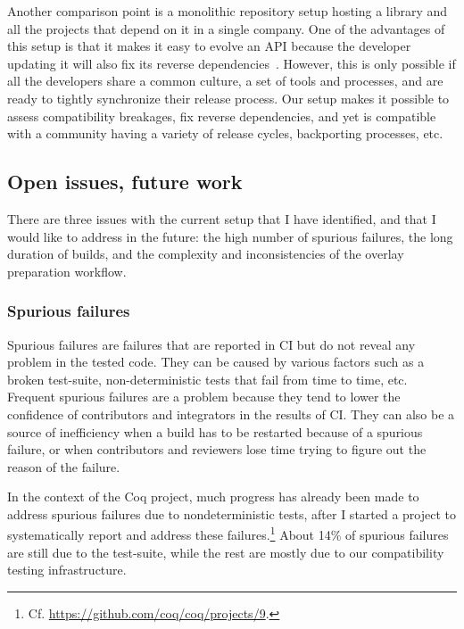 
Another comparison point is a monolithic repository setup hosting a library and all the projects that depend on it in a single company.
One of the advantages of this setup is that it makes it easy to evolve an API because the developer updating it will also fix its reverse dependencies~\cite{jaspan2018advantages}.
However, this is only possible if all the developers share a common culture, a set of tools and processes, and are ready to tightly synchronize their release process.
Our setup makes it possible to assess compatibility breakages, fix reverse dependencies, and yet is compatible with a community having a variety of release cycles, backporting processes, etc.

\subsection{Open issues, future work}

\label{sec:open-issues-ci}

There are three issues with the current setup that I have identified, and that I would like to address in the future: the high number of spurious failures, the long duration of builds, and the complexity and inconsistencies of the overlay preparation workflow.

\subsubsection{Spurious failures}

Spurious failures are failures that are reported in CI but do not reveal any problem in the tested code.
They can be caused by various factors such as a broken test-suite, non-deterministic tests that fail from time to time, etc.
Frequent spurious failures are a problem because they tend to lower the confidence of contributors and integrators in the results of CI.
They can also be a source of inefficiency when a build has to be restarted because of a spurious failure, or when contributors and reviewers lose time trying to figure out the reason of the failure.

In the context of the Coq project, much progress has already been made to address spurious failures due to nondeterministic tests, after I started a project to systematically report and address these failures.\footnote{
	Cf. \url{https://github.com/coq/coq/projects/9}.
}
About 14\% of spurious failures are still due to the test-suite, while the rest are mostly due to our compatibility testing infrastructure.

